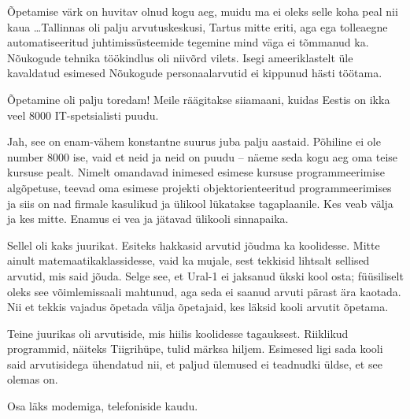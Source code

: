 Õpetamise värk on huvitav olnud kogu aeg, muidu ma ei oleks selle 
koha peal nii kaua \ldots Tallinnas oli palju arvutuskeskusi, Tartus mitte eriti, aga ega
tolleaegne automatiseeritud juhtimissüsteemide 
tegemine mind väga ei tõmmanud ka. Nõukogude tehnika töökindlus oli niivõrd vilets. Isegi 
ameeriklastelt üle kavaldatud esimesed Nõukogude personaalarvutid ei kippunud 
hästi töötama. 

Õpetamine oli palju toredam! Meile räägitakse siiamaani, kuidas 
Eestis on ikka veel 8000 IT-spetsialisti puudu. 


Jah, see on enam-vähem konstantne suurus juba 
palju aastaid. Põhiline ei ole number 8000 ise, vaid
et neid ja neid on puudu – näeme seda kogu aeg oma teise kursuse pealt. 
Nimelt omandavad inimesed esimese kursuse programmeerimise algõpetuse, teevad 
oma esimese projekti objektorienteeritud programmeerimises ja siis on nad 
firmale kasulikud ja ülikool lükatakse tagaplaanile. Kes veab välja 
ja kes mitte. Enamus ei vea ja jätavad ülikooli sinnapaika. 


Sellel oli kaks juurikat. Esiteks hakkasid arvutid 
jõudma ka koolidesse. Mitte ainult matemaatikaklassidesse, vaid ka mujale, sest 
tekkisid lihtsalt sellised arvutid, mis said jõuda. Selge see, et Ural-1 ei jaksanud ükski 
kool osta; füüsiliselt oleks see võimlemissaali mahtunud, 
aga seda ei saanud arvuti pärast ära kaotada. Nii et tekkis vajadus õpetada välja õpetajaid, kes 
läksid kooli arvutit õpetama. 

Teine juurikas oli arvutiside, mis hiilis koolidesse tagauksest. Riiklikud programmid, näiteks
Tiigrihüpe, tulid märksa hiljem. Esimesed ligi sada kooli said arvutisidega ühendatud nii, et paljud ülemused ei 
teadnudki üldse, et see olemas on. 


Osa läks modemiga, telefoniside kaudu. 


